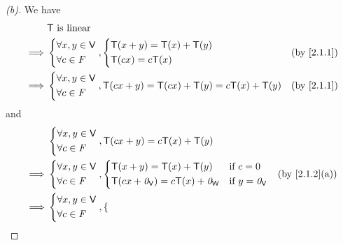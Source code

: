 \begin{proof}[(b)]
  We have
  \begin{align*}
             & \T \text{ is linear}                                                       \\
    \implies & \begin{dcases}
                 \forall x, y \in \V \\
                 \forall c \in \F
               \end{dcases}, \begin{dcases}
                               \T(x + y) = \T(x) + \T(y) \\
                               \T(cx) = c\T(x)
                             \end{dcases}                               &  & \by{2.1.1}   \\
    \implies & \begin{dcases}
                 \forall x, y \in \V \\
                 \forall c \in \F
               \end{dcases}, \T(cx + y) = \T(cx) + \T(y) = c\T(x) + \T(y) &  & \by{2.1.1}
  \end{align*}
  and
  \begin{align*}
             & \begin{dcases}
                 \forall x, y \in \V \\
                 \forall c \in \F
               \end{dcases}, \T(cx + y) = c\T(x) + \T(y)                                          \\
    \implies & \begin{dcases}
                 \forall x, y \in \V \\
                 \forall c \in \F
               \end{dcases}, \begin{dcases}
                               \T(x + y) = \T(x) + \T(y)             & \text{if } c = 0        \\
                               \T(cx + \zv_{\V}) = c\T(x) + \zv_{\W} & \text{if } y = \zv_{\V}
                             \end{dcases} &  & \by{2.1.2}[a]      \\
    \implies & \begin{dcases}
                 \forall x, y \in \V \\
                 \forall c \in \F
               \end{dcases}, \begin{dcases}

\end{dcases}
\end{align*}
\end{proof}
